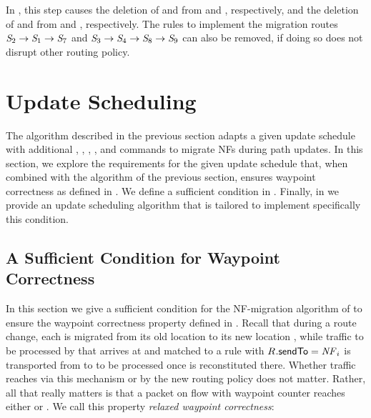 In , this step causes the deletion of
 and  from  and ,
respectively, and the deletion of  and  from
 and , respectively.  The rules to implement
the migration routes $\switchID{2} \rightarrow \switchID{1}
\rightarrow \switchID{7}$ and $\switchID{3} \rightarrow \switchID{4}
\rightarrow \switchID{8} \rightarrow \switchID{9}$ can also be
removed, if doing so does not disrupt other routing policy.

\section{Update Scheduling}
\label{sec:schedule}

The algorithm described in the previous section adapts a given update
schedule with additional \flowDel, \flowAdd, \export, , and
\release commands to migrate NFs during path updates.  In this
section, we explore the requirements for the given update schedule
that, when combined with the algorithm of the previous section,
ensures waypoint correctness as defined in
.  We define a sufficient condition in
.  Finally, in
 we provide an update scheduling algorithm
that is tailored to implement specifically this condition.

\subsection{A Sufficient Condition for Waypoint Correctness}
\label{sec:schedule:condition}

In this section we give a sufficient condition for the NF-migration
algorithm of  to ensure the waypoint correctness
property defined in .  Recall that
during a route change, each \nfID{\nfIdx} is migrated from its old
location \oldSwitchID{\nfIdx} to its new location
\newSwitchID{\nfIdx}, while traffic to be processed by \nfID{\nfIdx}
that arrives at \oldSwitchID{\nfIdx} and matched to a rule 
with $\ruleID{}{\sendToField} = \nfID{\nfIdx}$ is transported from
\oldSwitchID{\nfIdx} to \newSwitchID{\nfIdx} to be processed once
\nfID{\nfIdx} is reconstituted there.  Whether traffic reaches
\newSwitchID{\nfIdx} via this mechanism or by the new routing policy
does not matter.  Rather, all that really matters is that a packet on
flow \flowID{} with waypoint counter \wpIdx reaches either
\oldSwitchID{\wpFn{\flowID{}}{\wpIdx}} or
\newSwitchID{\wpFn{\flowID{}}{\wpIdx}}.  We call this property
\textit{relaxed waypoint correctness}:

